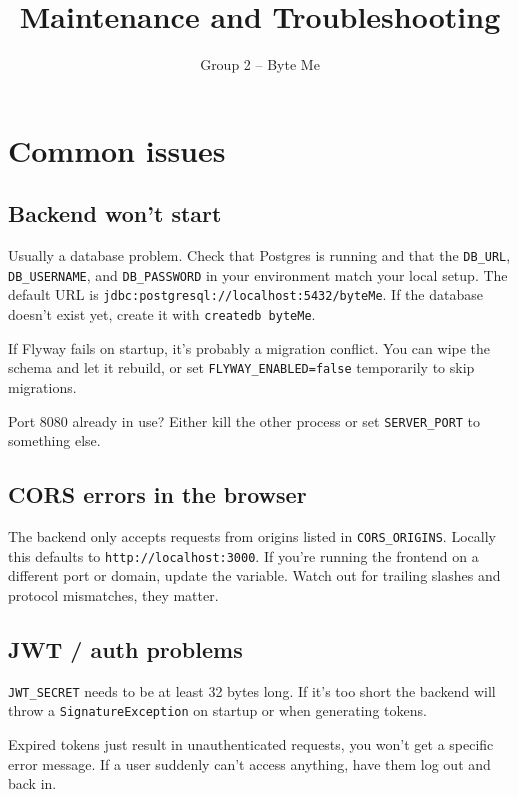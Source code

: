 \documentclass[a4paper,11pt]{article}
\title{Maintenance and Troubleshooting}
\author{Group 2 -- Byte Me}
\date{}
\begin{document}
\maketitle

\section{Common issues}

\subsection{Backend won't start}

Usually a database problem. Check that Postgres is running and that the \texttt{DB\_URL}, \texttt{DB\_USERNAME}, and \texttt{DB\_PASSWORD} in your environment match your local setup. The default URL is \texttt{jdbc:postgresql://localhost:5432/byteMe}. If the database doesn't exist yet, create it with \texttt{createdb byteMe}.

If Flyway fails on startup, it's probably a migration conflict. You can wipe the schema and let it rebuild, or set \texttt{FLYWAY\_ENABLED=false} temporarily to skip migrations.

Port 8080 already in use? Either kill the other process or set \texttt{SERVER\_PORT} to something else.

\subsection{CORS errors in the browser}

The backend only accepts requests from origins listed in \texttt{CORS\_ORIGINS}. Locally this defaults to \texttt{http://localhost:3000}. If you're running the frontend on a different port or domain, update the variable. Watch out for trailing slashes and protocol mismatches, they matter.

\subsection{JWT / auth problems}

\texttt{JWT\_SECRET} needs to be at least 32 bytes long. If it's too short the backend will throw a \texttt{SignatureException} on startup or when generating tokens.

Expired tokens just result in unauthenticated requests, you won't get a specific error message. If a user suddenly can't access anything, have them log out and back in.
\end{document}
